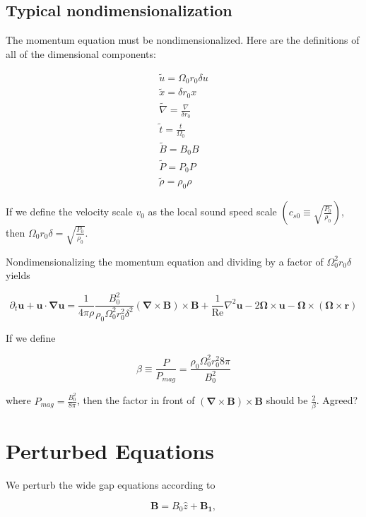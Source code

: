 \documentclass{paper}
\newcommand{\beq}{\begin{equation}}
\newcommand{\eeq}{\end{equation}}
\newcommand\reye{\mathrm{Re}}
\begin{document}
\subsection{Typical nondimensionalization}
The momentum equation must be nondimensionalized. Here are the definitions of all of the dimensional components: 

\begin{equation}
\begin{multlined}
\widetilde{u} = \Omega_0 r_0 \delta u \\
\widetilde{x} = \delta r_0 x \\
\widetilde{\nabla} = \frac{\nabla}{\delta r_0}\\
\widetilde{t} = \frac{t}{\Omega_0}\\ 
\widetilde{B} = B_0 B \\
\widetilde{P} = P_0 P \\
\widetilde{\rho} = \rho_0 \rho 
\end{multlined}
\end{equation}

If we define the velocity scale $v_0$ as the local sound speed scale $\left(c_{s0} \equiv \sqrt{\frac{P_0}{\rho_0}}\right)$, then $\Omega_0 r_0 \delta = \sqrt{\frac{P_0}{\rho_0}}$.

Nondimensionalizing the momentum equation and dividing by a factor of $\Omega_0^2 r_0 \delta$ yields

\beq
\partial_t \mathbf{u} + \mathbf{u}\cdot \mathbf{\nabla} \mathbf{u} = \frac{1}{4 \pi \rho} \frac{B_0^2}{\rho_0 \Omega_0^2 r_0^2 \delta^2} (\mathbf{\nabla}\times\mathbf{B})\times\mathbf{B} + \frac{1}{\reye}\nabla^2 \mathbf{u} - 2 \mathbf{\Omega} \times \mathbf{u} - \mathbf{\Omega} \times (\mathbf{\Omega} \times \mathbf{r})
\eeq

If we define

\beq
\beta \equiv \frac{P}{P_{mag}} = \frac{\rho_0 \Omega_0^2 r_0^2 8 \pi}{B_0^2}
\eeq

where $P_{mag} = \frac{B_0^2}{8 \pi}$, then the factor in front of $(\mathbf{\nabla}\times\mathbf{B})\times\mathbf{B} $ should be $\frac{2}{\beta}$. Agreed?

\section{Perturbed Equations}

We perturb the wide gap equations according to 

\beq
\mathbf{B} = B_0 \hat{z} + \mathbf{B_1},
\eeq
\end{document}
